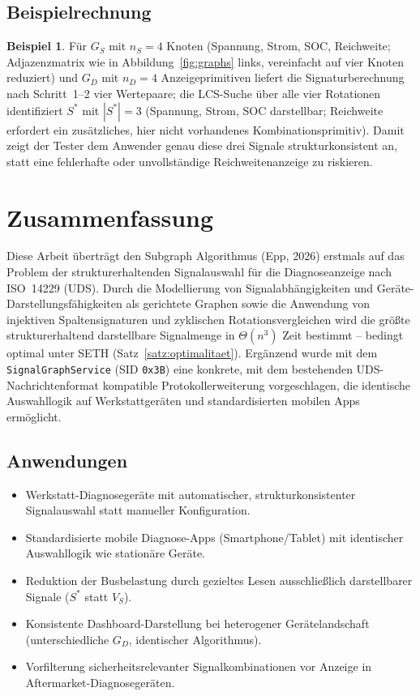 ﻿\documentclass[a4paper,12pt]{article}
\theoremstyle{definition}
\newtheorem{beispiel}{Beispiel}
\begin{document}
\subsection{Beispielrechnung}

\begin{beispiel}
	Für $G_S$ mit $n_S = 4$ Knoten (Spannung, Strom, SOC, Reichweite; Adjazenzmatrix wie in Abbildung~\ref{fig:graphs} links, vereinfacht auf vier Knoten reduziert) und $G_D$ mit $n_D = 4$ Anzeigeprimitiven liefert die Signaturberechnung nach Schritt~1--2 vier Wertepaare; die LCS-Suche über alle vier Rotationen identifiziert $S^\ast$ mit $|S^\ast| = 3$ (Spannung, Strom, SOC darstellbar; Reichweite erfordert ein zusätzliches, hier nicht vorhandenes Kombinationsprimitiv). Damit zeigt der Tester dem Anwender genau diese drei Signale strukturkonsistent an, statt eine fehlerhafte oder unvollständige Reichweitenanzeige zu riskieren.
\end{beispiel}

\section{Zusammenfassung}

Diese Arbeit überträgt den Subgraph Algorithmus (Epp, 2026) erstmals auf das Problem der strukturerhaltenden Signalauswahl für die Diagnoseanzeige nach ISO~14229 (UDS). Durch die Modellierung von Signalabhängigkeiten und Geräte-Darstellungsfähigkeiten als gerichtete Graphen sowie die Anwendung von injektiven Spaltensignaturen und zyklischen Rotationsvergleichen wird die größte strukturerhaltend darstellbare Signalmenge in $\Theta(n^3)$ Zeit bestimmt -- bedingt optimal unter SETH (Satz~\ref{satz:optimalitaet}). Ergänzend wurde mit dem \texttt{SignalGraphService} (SID \texttt{0x3B}) eine konkrete, mit dem bestehenden UDS-Nachrichtenformat kompatible Protokollerweiterung vorgeschlagen, die identische Auswahllogik auf Werkstattgeräten und standardisierten mobilen Apps ermöglicht.

\subsection{Anwendungen}

\begin{itemize}
	\item Werkstatt-Diagnosegeräte mit automatischer, strukturkonsistenter Signalauswahl statt manueller Konfiguration.
	\item Standardisierte mobile Diagnose-Apps (Smartphone/Tablet) mit identischer Auswahllogik wie stationäre Geräte.
	\item Reduktion der Busbelastung durch gezieltes Lesen ausschließlich darstellbarer Signale ($S^\ast$ statt $V_S$).
	\item Konsistente Dashboard-Darstellung bei heterogener Gerätelandschaft (unterschiedliche $G_D$, identischer Algorithmus).
	\item Vorfilterung sicherheitsrelevanter Signalkombinationen vor Anzeige in Aftermarket-Diagnosegeräten.
\end{itemize}
\end{document}
